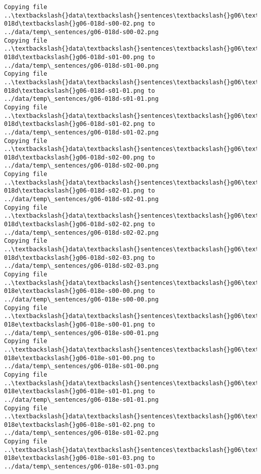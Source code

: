\documentclass[11pt]{article}
\begin{document}
\begin{Verbatim}[commandchars=\\\{\}]
Copying file ..\textbackslash{}data\textbackslash{}sentences\textbackslash{}g06\textbackslash{}g06-018d\textbackslash{}g06-018d-s00-02.png to
../data/temp\_sentences/g06-018d-s00-02.png
Copying file ..\textbackslash{}data\textbackslash{}sentences\textbackslash{}g06\textbackslash{}g06-018d\textbackslash{}g06-018d-s01-00.png to
../data/temp\_sentences/g06-018d-s01-00.png
Copying file ..\textbackslash{}data\textbackslash{}sentences\textbackslash{}g06\textbackslash{}g06-018d\textbackslash{}g06-018d-s01-01.png to
../data/temp\_sentences/g06-018d-s01-01.png
Copying file ..\textbackslash{}data\textbackslash{}sentences\textbackslash{}g06\textbackslash{}g06-018d\textbackslash{}g06-018d-s01-02.png to
../data/temp\_sentences/g06-018d-s01-02.png
Copying file ..\textbackslash{}data\textbackslash{}sentences\textbackslash{}g06\textbackslash{}g06-018d\textbackslash{}g06-018d-s02-00.png to
../data/temp\_sentences/g06-018d-s02-00.png
Copying file ..\textbackslash{}data\textbackslash{}sentences\textbackslash{}g06\textbackslash{}g06-018d\textbackslash{}g06-018d-s02-01.png to
../data/temp\_sentences/g06-018d-s02-01.png
Copying file ..\textbackslash{}data\textbackslash{}sentences\textbackslash{}g06\textbackslash{}g06-018d\textbackslash{}g06-018d-s02-02.png to
../data/temp\_sentences/g06-018d-s02-02.png
Copying file ..\textbackslash{}data\textbackslash{}sentences\textbackslash{}g06\textbackslash{}g06-018d\textbackslash{}g06-018d-s02-03.png to
../data/temp\_sentences/g06-018d-s02-03.png
Copying file ..\textbackslash{}data\textbackslash{}sentences\textbackslash{}g06\textbackslash{}g06-018e\textbackslash{}g06-018e-s00-00.png to
../data/temp\_sentences/g06-018e-s00-00.png
Copying file ..\textbackslash{}data\textbackslash{}sentences\textbackslash{}g06\textbackslash{}g06-018e\textbackslash{}g06-018e-s00-01.png to
../data/temp\_sentences/g06-018e-s00-01.png
Copying file ..\textbackslash{}data\textbackslash{}sentences\textbackslash{}g06\textbackslash{}g06-018e\textbackslash{}g06-018e-s01-00.png to
../data/temp\_sentences/g06-018e-s01-00.png
Copying file ..\textbackslash{}data\textbackslash{}sentences\textbackslash{}g06\textbackslash{}g06-018e\textbackslash{}g06-018e-s01-01.png to
../data/temp\_sentences/g06-018e-s01-01.png
Copying file ..\textbackslash{}data\textbackslash{}sentences\textbackslash{}g06\textbackslash{}g06-018e\textbackslash{}g06-018e-s01-02.png to
../data/temp\_sentences/g06-018e-s01-02.png
Copying file ..\textbackslash{}data\textbackslash{}sentences\textbackslash{}g06\textbackslash{}g06-018e\textbackslash{}g06-018e-s01-03.png to
../data/temp\_sentences/g06-018e-s01-03.png

\end{Verbatim}
\end{document}
